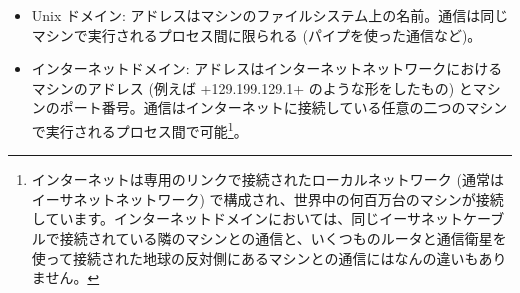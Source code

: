 \begin{itemize}
\item Unix ドメイン:
  アドレスはマシンのファイルシステム上の名前。通信は同じマシンで実行されるプロセス間に限られる (パイプを使った通信など)。
%
\item インターネットドメイン: アドレスはインターネットネットワークにおけるマシンのアドレス (例えば \ml+129.199.129.1+ のような形をしたもの) とマシンのポート番号。通信はインターネットに接続している任意の二つのマシンで実行されるプロセス間で可能\footnote{インターネットは専用のリンクで接続されたローカルネットワーク (通常はイーサネットネットワーク) で構成され、世界中の何百万台のマシンが接続しています。インターネットドメインにおいては、同じイーサネットケーブルで接続されている隣のマシンとの通信と、いくつものルータと通信衛星を使って接続された地球の反対側にあるマシンとの通信にはなんの違いもありません。}。
\end{itemize}

